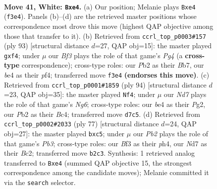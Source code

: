 \documentclass[11pt]{article}
\begin{document}
\clearpage

\begin{figure}[p]\centering
\begin{subfigure}{0.46\textwidth}\centering
\resizebox{\linewidth}{!}{%
\newchessgame
\chessboard[
  setfen={6k1/3N4/8/5p2/2p1bP2/1pp2B2/1P6/K7 w - - 0 41},
  showmover=false,
  pgfstyle=straightmove, color=movearrow, markmove={f3-e4}
]}
\caption{}
\end{subfigure}\hfill
\begin{subfigure}{0.46\textwidth}\centering
\resizebox{\linewidth}{!}{%
\newchessgame
\chessboard[
  setfen={8/1b6/7p/6p1/3k1PB1/6PP/4K3/8 b - - 0 47},
  showmover=false,
  pgfstyle=straightmove, color=movearrow, markmove={g5-f4}
]}
\caption{}
\end{subfigure}
\\[4pt]
\begin{subfigure}{0.46\textwidth}\centering
\resizebox{\linewidth}{!}{%
\newchessgame
\chessboard[
  setfen={8/8/3k1pN1/8/p1B5/1pK2Ppb/6P1/8 w - - 0 48},
  showmover=false,
  pgfstyle=straightmove, color=movearrow, markmove={g6-f4}
]}
\caption{}
\end{subfigure}\hfill
\begin{subfigure}{0.46\textwidth}\centering
\resizebox{\linewidth}{!}{%
\newchessgame
\chessboard[
  setfen={4k3/8/1p1p4/2P3Bp/2P4P/4KP2/2b5/8 b - - 0 39},
  showmover=false,
  pgfstyle=straightmove, color=movearrow, markmove={b6-c5}
]}
\caption{}
\end{subfigure}
\caption{\textbf{Move 41, White: \texttt{Bxe4}.} (a) Our position; Melanie plays \texttt{Bxe4} (\texttt{f3e4}). Panels (b)--(d) are the retrieved master positions whose correspondence most drove this move (highest QAP objective among those that transfer to it). (b) Retrieved from \texttt{ccrl\_top\_p0003\#157} (ply 93) [structural distance $d$=27, QAP obj=15]: the master played \texttt{gxf4}; under $\mu$ our \emph{Bf3} plays the role of that game's \emph{Pg4} (a \textbf{cross-type} correspondence); cross-type roles: our \emph{P}b2 as their \emph{B}b7, our \emph{b}e4 as their \emph{p}f4; transferred move \texttt{f3e4} \textbf{(endorses this move)}. (c) Retrieved from \texttt{ccrl\_top\_p0001\#1859} (ply 94) [structural distance $d$=23, QAP obj=35]: the master played \texttt{Nf4}; under $\mu$ our \emph{Nd7} plays the role of that game's \emph{Ng6}; cross-type roles: our \emph{b}e4 as their \emph{P}g2, our \emph{P}b2 as their \emph{B}c4; transferred move \texttt{d7c5}. (d) Retrieved from \texttt{ccrl\_top\_p0002\#2033} (ply 77) [structural distance $d$=24, QAP obj=27]: the master played \texttt{bxc5}; under $\mu$ our \emph{Pb2} plays the role of that game's \emph{Pb3}; cross-type roles: our \emph{B}f3 as their \emph{p}h4, our \emph{N}d7 as their \emph{B}c2; transferred move \texttt{b2c3}. Synthesis: 1 retrieved analog transferred to \texttt{Bxe4} (summed QAP objective 15, the strongest correspondence among the candidate moves); Melanie committed it via the \texttt{search} selector.}
\label{fig:thought-m80}
\end{figure}
\end{document}
